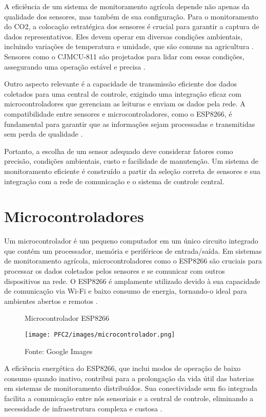 A eficiência de um sistema de monitoramento agrícola depende não apenas da qualidade dos sensores, mas também de sua configuração. Para o monitoramento do CO2, a colocação estratégica dos sensores é crucial para garantir a captura de dados representativos. Eles devem operar em diversas condições ambientais, incluindo variações de temperatura e umidade, que são comuns na agricultura \cite{inamasu_agricultura_2011}. Sensores como o CJMCU-811 são projetados para lidar com essas condições, assegurando uma operação estável e precisa \cite{sparkfun_ccs811_guide}.

Outro aspecto relevante é a capacidade de transmissão eficiente dos dados coletados para uma central de controle, exigindo uma integração eficaz com microcontroladores que gerenciam as leituras e enviam os dados pela rede. A compatibilidade entre sensores e microcontroladores, como o ESP8266, é fundamental para garantir que as informações sejam processadas e transmitidas sem perda de qualidade \cite{sparkfun_ccs811_guide}.

Portanto, a escolha de um sensor adequado deve considerar fatores como precisão, condições ambientais, custo e facilidade de manutenção. Um sistema de monitoramento eficiente é construído a partir da seleção correta de sensores e sua integração com a rede de comunicação e o sistema de controle central.


\section{Microcontroladores}

Um microcontrolador é um pequeno computador em um único circuito integrado que contém um processador, memória e periféricos de entrada/saída. Em sistemas de monitoramento agrícola, microcontroladores como o ESP8266 são cruciais para processar os dados coletados pelos sensores e se comunicar com outros dispositivos na rede. O ESP8266 é amplamente utilizado devido à sua capacidade de comunicação via Wi-Fi e baixo consumo de energia, tornando-o ideal para ambientes abertos e remotos \cite{randomnerdtutorials_esp_mesh}.


\begin{figure}[H]
    \centering
     \caption{Microcontrolador ESP8266}
    \texttt{[image: PFC2/images/microcontrolador.png]}
    \label{fig:microcontrolador}
     \caption*{Fonte: Google Images}
\end{figure}

A eficiência energética do ESP8266, que inclui modos de operação de baixo consumo quando inativo, contribui para a prolongação da vida útil das baterias em sistemas de monitoramento distribuídos. Sua conectividade sem fio integrada facilita a comunicação entre nós sensoriais e a central de controle, eliminando a necessidade de infraestrutura complexa e custosa \cite{espressif_esp8266}.

